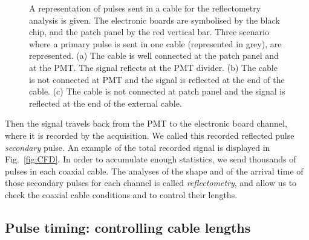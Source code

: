 \begin{figure}
\begin{subfigure}[b]{0.3\textwidth}
     \end{subfigure}
     \caption{A representation of pulses sent in a cable for the reflectometry analysis is given.
       The electronic boards are symbolised by the black chip, and the patch panel by the red vertical bar.
       Three scenario where a primary pulse is sent in one cable (represented in grey), are represented.
     (a) The cable is well connected at the patch panel and at the PMT. The signal reflects at the PMT divider.
     (b) The cable is not connected at PMT and the signal is reflected at the end of the cable.
     (c) The cable is not connected at patch panel and the signal is reflected at the end of the external cable.\label{fig:reflecto_scheme}}

\end{figure}
Then the signal travels back from the PMT to the electronic board channel, where it is recorded by the acquisition.
We called this recorded reflected pulse \emph{secondary} pulse.
An example of the total recorded signal is displayed in Fig.~\ref{fig:CFD}.
In order to accumulate enough statistics, we send thousands of pulses in each coaxial cable.
The analyses of the shape and of the arrival time of those secondary pulses for each channel is called \emph{reflectometry}, and allow us to check the coaxial cable conditions and to control their lengths.

\subsection{Pulse timing: controlling cable lengths}
\label{subsec:timing}

